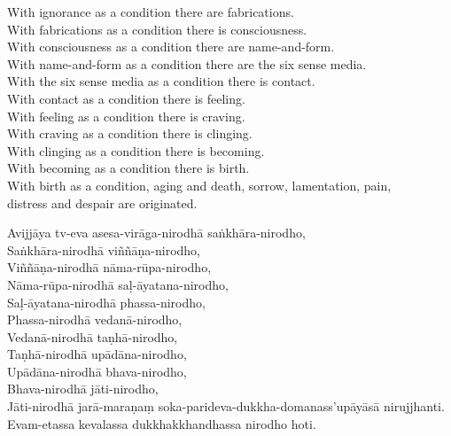 \begin{english}
  With ignorance as a condition there are fabrications.\\
  With fabrications as a condition there is consciousness.\\
  With consciousness as a condition there are name-and-form.\\
  With name-and-form as a condition there are the six sense media.\\
  With the six sense media as a condition there is contact.\\
  With contact as a condition there is feeling.\\
  With feeling as a condition there is craving.\\
  With craving as a condition there is clinging.\\
  With clinging as a condition there is becoming.\\
  With becoming as a condition there is birth.\\
  With birth as a condition, aging and death, sorrow, lamentation, pain,\\
  distress and despair are originated.
\end{english}

Avijjāya tv-eva asesa-virāga-nirodhā saṅkhāra-nirodho,\\
Saṅkhāra-nirodhā viññāṇa-nirodho,\\
Viññāṇa-nirodhā nāma-rūpa-nirodho,\\
Nāma-rūpa-nirodhā saḷ-āyatana-nirodho,\\
Saḷ-āyatana-nirodhā phassa-nirodho,\\
Phassa-nirodhā vedanā-nirodho,\\
Vedanā-nirodhā taṇhā-nirodho,\\
Taṇhā-nirodhā upādāna-nirodho,\\
Upādāna-nirodhā bhava-nirodho,\\
Bhava-nirodhā jāti-nirodho,\\
Jāti-nirodhā jarā-maraṇaṃ soka-parideva-dukkha-domanass'upāyāsā nirujjhanti.\\
Evam-etassa kevalassa dukkhakkhandhassa nirodho hoti.


